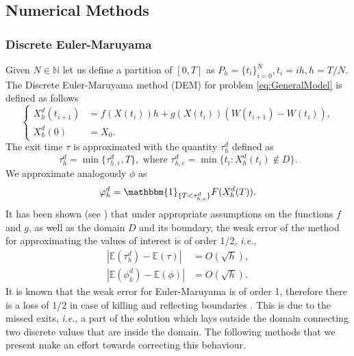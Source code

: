 \subsection{Numerical Methods}

\subsubsection{Discrete Euler-Maruyama}
Given $N \in \mathbb{N}$ let us define a partition of $[0,T]$ as $P_h = \{t_i\}_{i=0}^{N}, t_i = ih, h = T/N$. The Discrete Euler-Maruyama method (DEM) for problem \eqref{eq:GeneralModel} is defined as follows
\begin{equation}\label{eq:DEM}
	\left \{
	\begin{aligned}
		X_h^d(t_{i+1}) &= f(X(t_i))h + g(X(t_i))(W(t_{i+1}) - W(t_{i})),  \\
		X_h^d(0) &= X_0.
	\end{aligned} \right .
\end{equation} 
The exit time $\tau$ is approximated with the quantity $\tau_h^d$ defined as 
\begin{equation}\label{eq:TauDEM}
	\tau_h^d = \min\{\tau_{h,e}^d,T\}, \text{ where } \tau_{h,e}^d = \min \{t_i \colon X_h^d(t_i) \notin D\}.
\end{equation}
We approximate analogously $\phi$ as
\begin{equation}\label{eq:PhiDEM}
	 \phi_h^d = \mathbbm{1}_{\{T < \tau_{h,e}^d\}}F(X_h^d(T)).
\end{equation}
It has been shown (see \cite{Gobet2000, Gobet2010, Higham2013}) that under appropriate assumptions on the functions $f$ and $g$, as well as the domain $D$ and its boundary, the weak error of the method for approximating the values of interest is of order 1/2, \textit{i.e.},
\begin{align}\label{eq:ConvDEMTau}
	|\mathbb{E}(\tau_h^d) - \mathbb{E}(\tau)| &= O(\sqrt{h}), \\
	|\mathbb{E}(\phi_h^d) - \mathbb{E}(\phi)| &= O(\sqrt{h}).
\end{align}	
It is known that the weak error for Euler-Maruyama is of order 1, therefore there is a loss of 1/2 in case of killing and reflecting boundaries \cite[Chapter 14]{Kloeden1992}. This is due to the missed exits, \textit{i.e.}, a part of the solution which lays outside the domain connecting two discrete values that are inside the domain. The following methods that we present make an effort towards correcting this behaviour.
 
